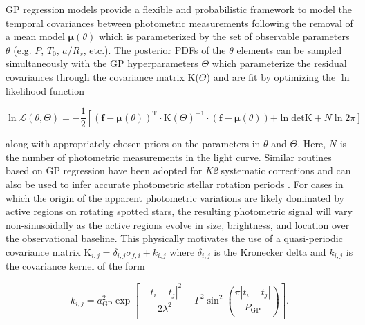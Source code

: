 GP regression models provide a flexible and probabilistic framework to model the temporal
covariances between photometric measurements following the removal of a mean model
$\boldsymbol{\mu}(\theta)$ which is parameterized by the set of observable parameters $\theta$
(e.g. $P$, $T_0$, $a/R_s$, etc.). The posterior PDFs of the $\theta$ elements 
can be sampled simultaneously with the GP hyperparameters $\Theta$ which parameterize
the residual covariances through the covariance matrix K($\Theta$) and are fit by
optimizing the $\ln$ likelihood function

\begin{equation}
  \ln{\mathcal{L}(\theta,\Theta)} = 
  -\frac{1}{2} \left[ (\mathbf{f}-\boldsymbol{\mu}(\theta))^{\text{T}}
    \cdot \text{K}(\Theta)^{-1} \cdot (\mathbf{f}-\boldsymbol{\mu}(\theta)) \right. 
    \left. + \ln{\mathrm{det} \text{K}} + N \ln{2 \pi} \right] \label{eq:lnL}
\end{equation}

\noindent along with appropriately chosen priors on the parameters in $\theta$ and $\Theta$.
Here, $N$ is the number of photometric measurements in the light curve. Similar routines based on GP regression 
have been adopted for \emph{K2} systematic corrections \citep[e.g.][]{aigrain15,crossfield15,aigrain16} 
and can also be used to infer accurate photometric stellar rotation periods \citep{angus18}. For cases in which
the origin of the apparent photometric variations are likely dominated by active regions on rotating spotted
stars, the resulting photometric signal will vary non-sinusoidally as the active regions 
evolve in size, brightness, and location over the observational baseline. This physically motivates the
use of a quasi-periodic covariance matrix K$_{i,j} = \delta_{i,j} \sigma_{f,i} + k_{i,j}$ where $\delta_{i,j}$
is the Kronecker delta and $k_{i,j}$ is the covariance kernel of the form

\begin{equation}
  k_{i,j} = a_{\text{GP}}^2 \exp{\left[ - \frac{|t_i-t_j|^2}{2\lambda^2} -\Gamma^2
      \sin^2{\left(\frac{\pi|t_i-t_j|}{P_{\text{GP}}} \right)} \right]}.
\end{equation}

